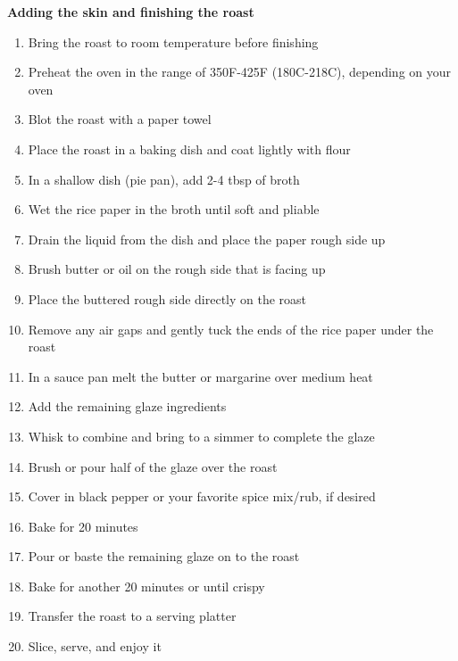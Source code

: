 \begin{footnotesize}
\noindent
\textbf{Adding the skin and finishing the roast}
\begin{enumerate}
    \item Bring the roast to room temperature before finishing     
    \item Preheat the oven in the range of 350\degree F-425\degree F (180\degree C-218\degree C), depending on your oven
    \item Blot the roast with a paper towel
    \item Place the roast in a baking dish and coat lightly with flour
    \item In a shallow dish (pie pan), add 2-4 tbsp of broth
    \item Wet the rice paper in the broth until soft and pliable
    \item Drain the liquid from the dish and place the paper rough side up
    \item Brush butter or oil on the rough side that is facing up
    \item Place the buttered rough side directly on the roast
    \item Remove any air gaps and gently tuck the ends of the rice paper under the roast
    \item In a sauce pan melt the butter or margarine over medium heat
    \item Add the remaining glaze ingredients
    \item Whisk to combine and bring to a simmer to complete the glaze
    \item Brush or pour half of the glaze over the roast
    \item Cover in black pepper or your favorite spice mix/rub, if desired
    \item Bake for 20 minutes
    \item Pour or baste the remaining glaze on to the roast
    \item Bake for another 20 minutes or until crispy
    \item Transfer the roast to a serving platter
    \item Slice, serve, and enjoy it
\end{enumerate}
\end{footnotesize}

\vspace{2em}
